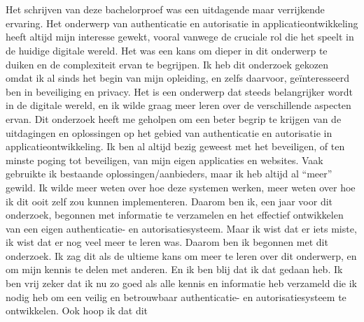 
\chapter*{}%
\label{ch:voorwoord}


Het schrijven van deze bachelorproef was een uitdagende maar verrijkende ervaring. Het onderwerp van authenticatie en autorisatie in applicatieontwikkeling heeft altijd mijn interesse gewekt, 
vooral vanwege de cruciale rol die het speelt in de huidige digitale wereld. Het was een kans om dieper in dit onderwerp te duiken en de complexiteit ervan te begrijpen.
Ik heb dit onderzoek gekozen omdat ik al sinds het begin van mijn opleiding, en zelfs daarvoor, geïnteresseerd ben in beveiliging en privacy. Het is een onderwerp dat steeds belangrijker wordt 
in de digitale wereld, en ik wilde graag meer leren over de verschillende aspecten ervan. Dit onderzoek heeft me geholpen om een beter begrip te krijgen van de uitdagingen en oplossingen op het gebied van
authenticatie en autorisatie in applicatieontwikkeling.
\newline
Ik ben al altijd bezig geweest met het beveiligen, of ten minste poging tot beveiligen, van mijn eigen applicaties en websites. Vaak gebruikte ik bestaande oplossingen/aanbieders, maar ik heb altijd al ``meer'' gewild.
Ik wilde meer weten over hoe deze systemen werken, meer weten over hoe ik dit ooit zelf zou kunnen implementeren. Daarom ben ik, een jaar voor dit onderzoek, begonnen met informatie te verzamelen en
het effectief ontwikkelen van een eigen authenticatie- en autorisatiesysteem. Maar ik wist dat er iets miste, ik wist dat er nog veel meer te leren was.
\newline
Daarom ben ik begonnen met dit onderzoek. Ik zag dit als de ultieme kans om meer te leren over dit onderwerp, en om mijn kennis te delen met anderen. En ik ben blij dat ik dat gedaan heb.
Ik ben vrij zeker dat ik nu zo goed als alle kennis en informatie heb verzameld die ik nodig heb om een veilig en betrouwbaar authenticatie- en autorisatiesysteem te ontwikkelen. Ook hoop ik dat dit
